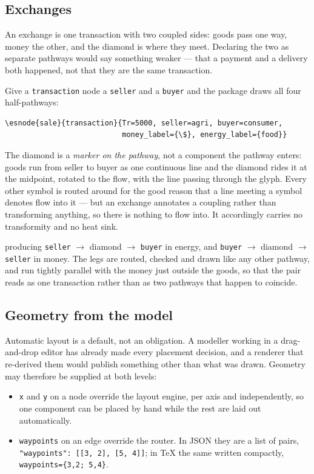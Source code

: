 \documentclass{article}
\begin{document}
\subsection{Exchanges}

An exchange is one transaction with two coupled sides: goods pass one way, money
the other, and the diamond is where they meet. Declaring the two as separate
pathways would say something weaker --- that a payment and a delivery both
happened, not that they are the same transaction.

Give a \texttt{transaction} node a \texttt{seller} and a \texttt{buyer} and the
package draws all four half-pathways:

\begin{verbatim}
\esnode{sale}{transaction}{Tr=5000, seller=agri, buyer=consumer,
                           money_label={\$}, energy_label={food}}
\end{verbatim}

The diamond is a \emph{marker on the pathway}, not a component the pathway
enters: goods run from seller to buyer as one continuous line and the diamond
rides it at the midpoint, rotated to the flow, with the line passing through the
glyph. Every other symbol is routed around for the good reason that a line
meeting a symbol denotes flow into it --- but an exchange annotates a coupling
rather than transforming anything, so there is nothing to flow into. It
accordingly carries no transformity and no heat sink.

\noindent producing \texttt{seller} $\to$ diamond $\to$ \texttt{buyer} in energy,
and \texttt{buyer} $\to$ diamond $\to$ \texttt{seller} in money. The legs are
routed, checked and drawn like any other pathway, and run tightly parallel with
the money just outside the goods, so that the pair reads as one transaction
rather than as two pathways that happen to coincide.

\subsection{Geometry from the model}

Automatic layout is a default, not an obligation. A modeller working in a
drag-and-drop editor has already made every placement decision, and a renderer
that re-derived them would publish something other than what was drawn. Geometry
may therefore be supplied at both levels:

\begin{itemize}
    \item \texttt{x} and \texttt{y} on a node override the layout engine, per
          axis and independently, so one component can be placed by hand while
          the rest are laid out automatically.
    \item \texttt{waypoints} on an edge override the router. In JSON they are a
          list of pairs, \texttt{"waypoints": [[3, 2], [5, 4]]}; in \TeX{} the
          same written compactly, \verb|waypoints={3,2; 5,4}|.
\end{itemize}
\end{document}
